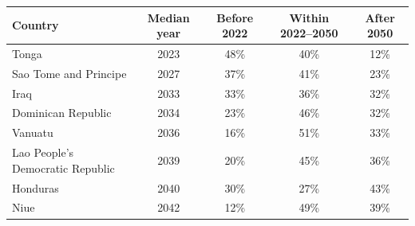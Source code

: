 \begin{tabular}{lcccc}
\toprule
Country & Median year & Before 2022 & Within 2022--2050 & After 2050 \\
\midrule
Tonga & 2023 & 48\% & 40\% & 12\% \\
Sao Tome and Principe & 2027 & 37\% & 41\% & 23\% \\
Iraq & 2033 & 33\% & 36\% & 32\% \\
Dominican Republic & 2034 & 23\% & 46\% & 32\% \\
Vanuatu & 2036 & 16\% & 51\% & 33\% \\
Lao People's Democratic Republic & 2039 & 20\% & 45\% & 36\% \\
Honduras & 2040 & 30\% & 27\% & 43\% \\
Niue & 2042 & 12\% & 49\% & 39\% \\
\bottomrule
\end{tabular}
